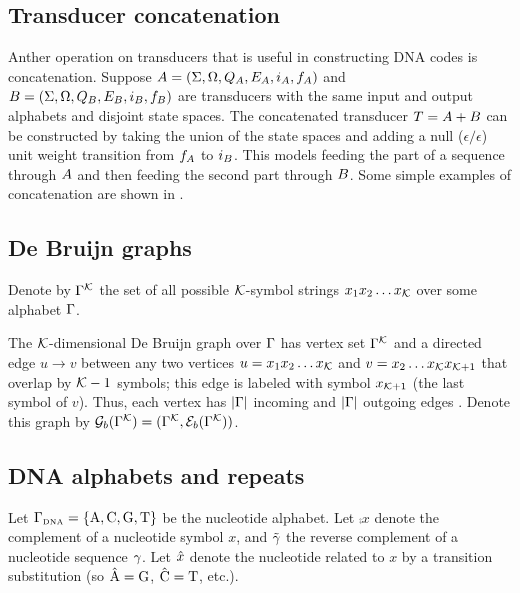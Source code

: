 \documentclass[english]{article}
\begin{document}

\subsection{Transducer concatenation}

Anther operation on transducers that is useful in constructing DNA codes
is concatenation.
Suppose
 $A = (\Sigma, \Omega, Q_{A}, E_{A}, i_{A}, f_{A})$ and
 $B = (\Sigma, \Omega, Q_{B}, E_{B}, i_{B}, f_{B})$
are transducers with the same input and output alphabets and disjoint state spaces.
The concatenated transducer $T = A + B$ can be constructed by
taking the union of the state spaces and adding a null ($\epsilon/\epsilon$) unit weight transition
from $f_{A}$ to $i_{B}$.
This models feeding the part of a sequence through $A$ and then feeding the second part through $B$.
Some simple examples of concatenation are shown in .

\subsection{De Bruijn graphs}

Denote by $\Gamma^{\cal K}$
the set of all possible ${\cal K}$-symbol strings
$x_1 x_2 \ldots x_{\cal K}$ over some alphabet $\Gamma$.

The ${\cal K}$-dimensional De Bruijn graph over $\Gamma$
has vertex set $\Gamma^{\cal K}$
and a directed edge $u \to v$ between any two vertices
$u=x_1 x_2 \ldots x_{\cal K}$ and $v=x_2 \ldots x_{\cal K} x_{{\cal K}+1}$
that overlap by ${\cal K}-1$ symbols; this edge is labeled with symbol $x_{{\cal K}+1}$ (the last symbol of $v$).
Thus, each vertex has $|\Gamma|$ incoming and $|\Gamma|$ outgoing edges \cite{DeBruijn1946,PevznerEtAl2001}.
Denote this graph by ${\cal G}_b(\Gamma^{\cal K}) = (\Gamma^{\cal K},{\cal E}_b(\Gamma^{\cal K}))$.

\subsection{DNA alphabets and repeats}

Let $\Gamma_{\mbox{\tiny DNA}} = \{ \mbox{A}, \mbox{C}, \mbox{G}, \mbox{T} \} $ be the nucleotide alphabet.
Let $\comp{x}$ denote the complement of a nucleotide symbol $x$,
and $\tilde{\gamma}$ the reverse complement of a nucleotide sequence $\gamma$.
Let $\hat{x}$ denote the nucleotide related to $x$ by a transition substitution
(so $\hat{\mbox{A}} = \mbox{G}$, $\hat{\mbox{C}}=\mbox{T}$, etc.).
\end{document}
